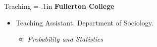 \documentclass{resume} %
\newenvironment{hangt}[1]
 {\par\vspace{-\parsep}%
  \begin{itemize}[label={#1\ \quad},leftmargin=*,labelsep=0pt]
  \raggedright
  \item\relax
  \vspace*{8pt}
  }
 {\end{itemize}}
\newcommand{\datefill}{\quad \hspace{12pt}}
\begin{document}
\begin{rSection}{Teaching}
{\parindent=-.1in {\bf Fullerton College}}

\vspace*{-.5em} 
\begin{hangt}{2012 \datefill}
Teaching Assistant. Department of Sociology.
\vspace*{-.5em} 
\begin{itemize}[leftmargin=.25in] \vspace*{-.25em} 
\item {\footnotesize \it Probability and Statistics}
\end{itemize}
\end{hangt}

\end{rSection}






\end{document}
